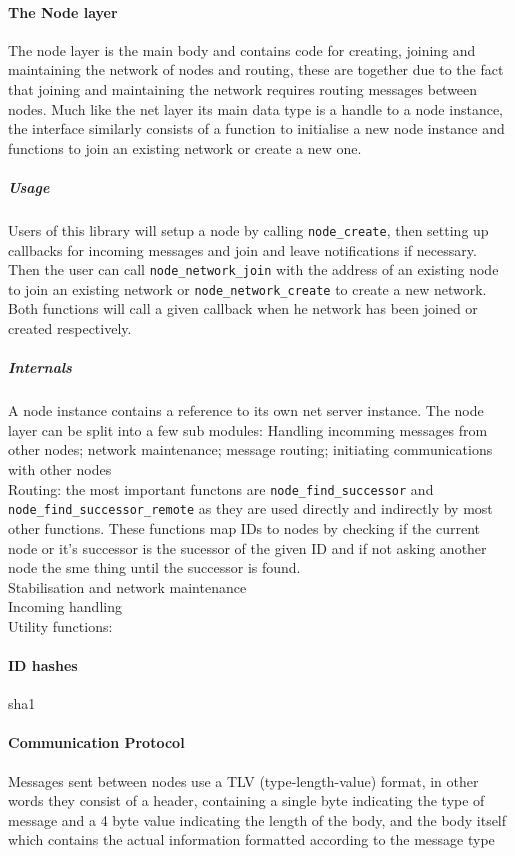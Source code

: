 \documentclass{article}
\begin{document}
\paragraph{The Node layer}
The node layer is the main body and contains code for creating, joining and maintaining the network of nodes and routing, these are together due to the fact that joining and maintaining the network requires routing messages between nodes. Much like the net layer its main data type is a handle to a node instance, the interface similarly consists of a function to initialise a new node instance and functions to join an existing network or create a new one. 
\subparagraph{Usage}
Users of this library will setup a node by calling \texttt{node\_create}, then setting up callbacks for incoming messages and join and leave notifications if necessary.
\\
Then the user can call \texttt{node\_network\_join} with the address of an existing node to join an existing network or \texttt{node\_network\_create} to create a new network. Both functions will call a given callback when he network has been joined or created respectively.

\subparagraph{Internals}
A node instance contains a reference to its own net server instance.
The node layer can be split into a few sub modules: Handling incomming messages from other nodes; network maintenance; message routing; initiating communications with other nodes
\\
Routing: the most important functons are \texttt{node\_find\_successor} and \texttt{node\_find\_successor\_remote} as they are used directly and indirectly by most other functions. These functions map IDs to nodes by checking if the current node or it's successor is the sucessor of the given ID and if not asking another node the sme thing until the successor is found.
\\
Stabilisation and network maintenance
\\
Incoming handling
\\
Utility functions:

\paragraph{ID hashes}
sha1 

\paragraph{Communication Protocol}
Messages sent between nodes use a TLV (type-length-value) format, in other words they consist of a header, containing a single byte indicating the type of message and a 4 byte value indicating the length of the body, and the body itself which contains the actual information formatted according to the message type
\end{document}
